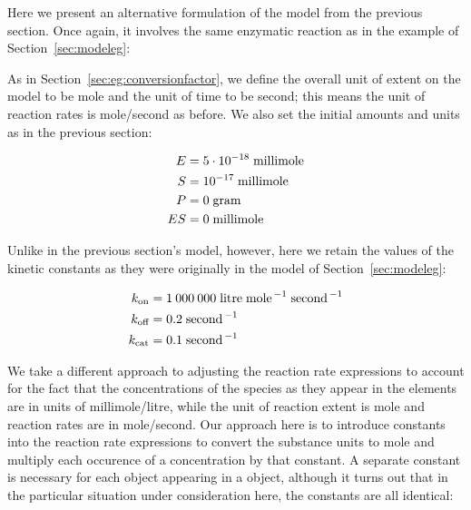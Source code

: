 Here we present an alternative formulation of the model from the
previous section.  Once again, it involves the same enzymatic
reaction as in the example of Section~\ref{sec:modeleg}:
\begin{center}
\end{center}
As in Section~\ref{sec:eg:conversionfactor}, we define the overall
unit of extent on the model to be \unit{mole} and the unit of time
to be \unit{second}; this means the unit of reaction rates is
\unit{mole}/\unit{second} as before.  We also set the initial
amounts and units as in the previous section:
\begin{linenomath}
  \begin{align*}
    E   & = 5 \cdot 10^{-18} \; \text{millimole} \\
    S   & = 10^{-17} \; \text{millimole} \\
    P   & = 0 \; \text{gram} \\
    ES  & = 0 \; \text{millimole}
  \end{align*}
\end{linenomath}
Unlike in the previous section's model, however, here we retain
the values of the kinetic constants as they were originally in the
model of Section~\ref{sec:modeleg}:
\begin{linenomath}
  \begin{align*}
    k_\text{on}  & = 1\:000\:000 \; \text{litre} \; \text{mole}^{\,-1} \; \text{second}^{\,-1}\\
    k_\text{off} & = 0.2 \; \text{second}^{\,-1}\\
    k_\text{cat} & = 0.1 \; \text{second}^{\,-1}
  \end{align*}
\end{linenomath}
We take a different approach to adjusting the reaction rate
expressions to account for the fact that the concentrations of the
species as they appear in the \KineticLaw elements are in units of
\unit{millimole}/\unit{litre}, while the unit of reaction extent
is \unit{mole} and reaction rates are in
\unit{mole}/\unit{second}.  Our approach here is to introduce
constants into the reaction rate expressions to convert the
substance units to \unit{mole} and multiply each occurence of a
concentration by that constant.  A separate constant is necessary
for each \Species object appearing in a \KineticLaw object,
although it turns out that in the particular situation under
consideration here, the constants are all identical:
